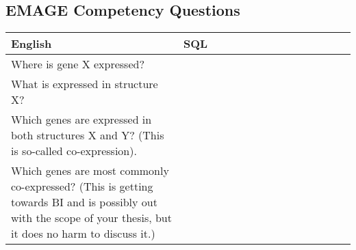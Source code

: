 \subsection{EMAGE Competency Questions}

\begin{center}
    \begin{tabular}{ | p{0.5\linewidth} | p{0.5\linewidth}|}
    \hline
    \textbf{English} & \textbf{SQL} \\ \hline
    Where is gene X expressed? &  \\ \hline
    What is expressed in structure X? &  \\ \hline
    Which genes are expressed in both structures X and Y?  (This is so-called co-expression). & \\ \hline
    Which genes are most commonly co-expressed? (This is getting towards BI and is possibly out with the scope of your thesis, but it does no harm to discuss it.) & \\ \hline
    \end{tabular}
\end{center}






